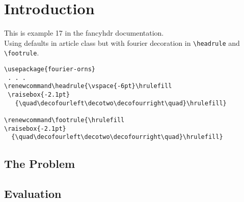 \documentclass{article}
\renewcommand\headrule{\vspace{-6pt}\hrulefill
 \raisebox{-2.1pt}
   {\quad\decofourleft\decotwo\decofourright\quad}\hrulefill}
\renewcommand\footrule{\hrulefill
\raisebox{-2.1pt}
  {\quad\decofourleft\decotwo\decofourright\quad}\hrulefill}
\begin{document}
\tableofcontents

\section{Introduction}

\begin{boxedminipage}{\textwidth}
This is example 17 in the fancyhdr documentation.\\
Using defaults in article class but with fourier decoration in \verb|\headrule| and \verb|\footrule|.
\begin{verbatim}
\usepackage{fourier-orns}
 . . .
\renewcommand\headrule{\vspace{-6pt}\hrulefill
 \raisebox{-2.1pt}
   {\quad\decofourleft\decotwo\decofourright\quad}\hrulefill}

\renewcommand\footrule{\hrulefill
\raisebox{-2.1pt}
  {\quad\decofourleft\decotwo\decofourright\quad}\hrulefill}
\end{verbatim}
\end{boxedminipage}

\subsection{The Problem}
\label{sec:problem}

\lipsum[1]

\subsection{Evaluation}

\lipsum
\end{document}
